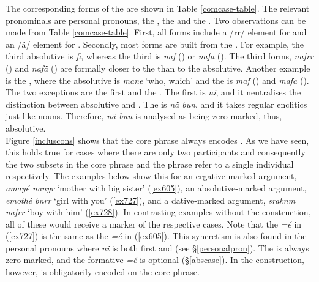 The corresponding  forms of the   are shown in Table \ref{comcase-table}. The relevant pronominals are personal pronouns, the  , the   and the . Two observations can be made from Table \ref{comcase-table}. First, all forms include a /rr/ element for  and an /ä/ element for . Secondly, most forms are built from the  . For example, the third  absolutive is \emph{fi}, whereas the third   is \emph{naf} (\Sg) or \emph{nafa} (\Nsg). The  third  forms, \emph{nafrr} (\Du) and \emph{nafä} (\Pl) are formally closer to the  than to the absolutive. Another example is the , where the absolutive is \emph{mane} `who, which' and the  is \emph{maf} (\Sg) and \emph{mafa} (\Nsg). The two exceptions are the first  and the  . The first   is \emph{ni}, and it neutralises the distinction between absolutive and . The   is \emph{nä bun}, and it takes regular  enclitics just like nouns. Therefore, \emph{nä bun} is analysed as being zero-marked, thus, absolutive.\\

Figure \ref{incluscons} shows that the core phrase always encodes  . As we have seen, this holds true for cases where there are only two participants and consequently the two subsets in the core phrase and the  phrase refer to a single individual respectively. The examples below show this for an ergative-marked argument, \emph{amayé nanyr} `mother with big sister' (\ref{ex605}), an absolutive-marked argument, \emph{emothé bnrr} `girl with you' (\ref{ex727}), and a dative-marked argument, \emph{sraknm nafrr} `boy with him' (\ref{ex728}). In contrasting examples without the  construction, all of these would receive a  marker of the respective cases. Note that the   \emph{=é} in (\ref{ex727}) is the same as the   \emph{=é} in (\ref{ex605}). This syncretism is also found in the personal pronouns where \emph{ni} is both first    and  (see \S{}\ref{personalpron}). The   is always zero-marked, and the  formative \emph{=é} is optional (\S{}\ref{abscase}). In the  construction, however,   is obligatorily encoded on the core phrase.

